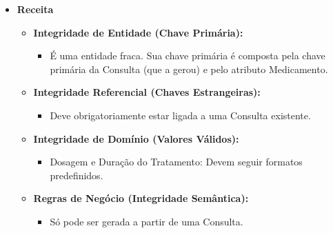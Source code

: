 \documentclass[12pt, a4paper]{article}
\begin{document}
\begin{itemize}
    \item \textbf{Receita}
    \begin{itemize}
        \item \textbf{Integridade de Entidade (Chave Primária):}
        \begin{itemize}
            \item É uma entidade fraca. Sua chave primária é composta pela chave primária da Consulta (que a gerou) e pelo atributo Medicamento.
        \end{itemize}
        \item \textbf{Integridade Referencial (Chaves Estrangeiras):}
        \begin{itemize}
            \item Deve obrigatoriamente estar ligada a uma Consulta existente.
        \end{itemize}
        \item \textbf{Integridade de Domínio (Valores Válidos):}
        \begin{itemize}
            \item Dosagem e Duração do Tratamento: Devem seguir formatos predefinidos.
        \end{itemize}
        \item \textbf{Regras de Negócio (Integridade Semântica):}
        \begin{itemize}
            \item Só pode ser gerada a partir de uma Consulta.
        \end{itemize}
    \end{itemize}


\end{itemize}
\end{document}
